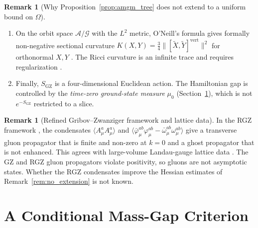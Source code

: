 \documentclass[11pt,a4paper]{amsart}
\theoremstyle{definition}
\newtheorem{remark}[theorem]{Remark}
\newcommand{\cA}{\mathcal{A}}
\newcommand{\cG}{\mathcal{G}}
\begin{document}
\begin{remark}[Why Proposition~\ref{prop:amgm_tree} does not extend to a uniform bound on $\Omega$]
\begin{enumerate}[label=(\roman*)]
    \item On the orbit space $\cA/\cG$ with the $L^2$ metric, O'Neill's formula gives formally non-negative sectional curvature $K(X,Y) = \frac34 \|[\tilde X, \tilde Y]^{\mathrm{vert}}\|^2$ for orthonormal $X,Y$ \cite{oneill1966fundamental, singer1981geometry, babelon1981riemannian}. The Ricci curvature is an infinite trace and requires regularization \cite{singer1981geometry, babelon1981riemannian}.
    \item Finally, $S_{\mathrm{GZ}}$ is a four-dimensional Euclidean action. The Hamiltonian gap is controlled by the \emph{time-zero ground-state measure} $\mu_0$ (Section~\ref{sec:gap}), which is not $e^{-S_{\mathrm{GZ}}}$ restricted to a slice.
\end{enumerate}
\end{remark}

\begin{remark}[Refined Gribov--Zwanziger framework and lattice data]
\label{rem:rgz}
In the RGZ framework \cite{dudal2008new, dudal2008condensates}, the condensates $\langle A^a_\mu A^a_\mu\rangle$ and $\langle \bar\varphi^{ab}_\mu\varphi^{ab}_\mu - \bar\omega^{ab}_\mu\omega^{ab}_\mu\rangle$ give a transverse gluon propagator that is finite and non-zero at $k = 0$ and a ghost propagator that is not enhanced. This agrees with large-volume Landau-gauge lattice data \cite{cucchieri2008constraints, bogolubsky2009lattice}. The GZ and RGZ gluon propagators violate positivity, so gluons are not asymptotic states. Whether the RGZ condensates improve the Hessian estimates of Remark~\ref{rem:no_extension} is not known.
\end{remark}

\section{A Conditional Mass-Gap Criterion}
\label{sec:gap}
\end{document}
